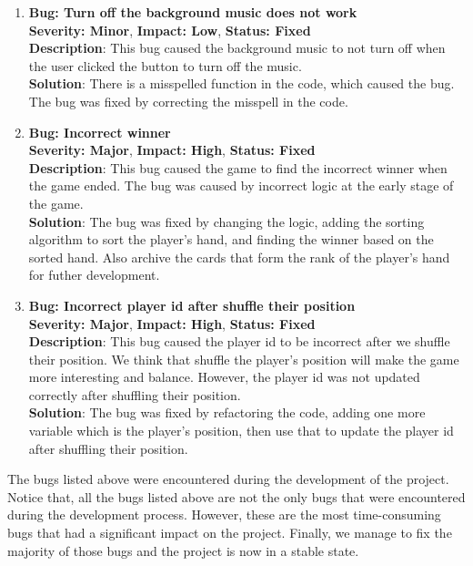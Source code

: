 \begin{enumerate}
    \item \textbf{Bug: Turn off the background music does not work}
    \\ \textbf{Severity: Minor}, \textbf{Impact: Low}, \textbf{Status: Fixed}
    \\ \textbf{Description}: This bug caused the background music to not turn off when the user clicked the button to turn off the music. 
    \\ \textbf{Solution}: There is a misspelled function in the code, which caused the bug. The bug was fixed by correcting the misspell in the code.

    \item \textbf{Bug: Incorrect winner}
    \\ \textbf{Severity: Major}, \textbf{Impact: High}, \textbf{Status: Fixed}
    \\ \textbf{Description}: This bug caused the game to find the incorrect winner when the game ended. The bug was caused by incorrect logic at the early stage of the game.
    \\ \textbf{Solution}: The bug was fixed by changing the logic, adding the sorting algorithm to sort the player's hand, and finding the winner based on the sorted hand. Also archive the cards that form the rank of the player's hand for futher development.

    \item \textbf{Bug: Incorrect player id after shuffle their position}
    \\ \textbf{Severity: Major}, \textbf{Impact: High}, \textbf{Status: Fixed}
    \\ \textbf{Description}: This bug caused the player id to be incorrect after we shuffle their position. We think that shuffle the player's position will make the game more interesting and balance. However, the player id was not updated correctly after shuffling their position.
    \\ \textbf{Solution}: The bug was fixed by refactoring the code, adding one more variable which is the player's position, then use that to update the player id after shuffling their position.
\end{enumerate}

\hspace{1cm} The bugs listed above were encountered during the development of the project. Notice that, all the bugs listed above are not the only bugs that were encountered during the development process. However, these are the most time-consuming bugs that had a significant impact on the project. Finally, we manage to fix the majority of those bugs and the project is now in a stable state.

